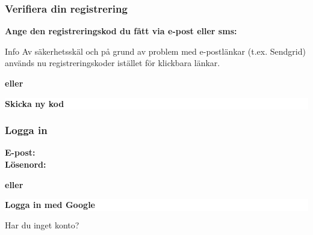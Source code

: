 \documentclass[10pt]{beamer}
\begin{document}
\begin{frame}[label=verify]
  \frametitle{Verifiera din registrering}

  \vspace{0.5cm}
  \begin{minipage}{0.9\textwidth}
    \small
    \textbf{Ange den registreringskod du fått via e-post eller sms:} \underline{\hspace{5cm}} \\

    \vspace{0.8cm}
    \begin{block}{Info}
      Av säkerhetsskäl och på grund av problem med e-postlänkar (t.ex. Sendgrid) används nu registreringskoder istället för klickbara länkar.
    \end{block}

    \vspace{1.2cm}
    \centering
    
    \vspace{1.2cm}
    \textcolor{warmbrown}{\textbf{eller}}
    
    \vspace{0.6cm}
    \colorbox{white}{%
      \parbox{5cm}{\centering\footnotesize\textbf{Skicka ny kod}}%
    }
  \end{minipage}
\end{frame}


\begin{frame}[label=login]
  \frametitle{Logga in}

  \vspace{0.5cm}
  \begin{minipage}{0.9\textwidth}
    \small
    \textbf{E-post:} \underline{\hspace{6.5cm}} \\
    \textbf{Lösenord:} \underline{\hspace{6.5cm}} \\

    \vspace{0.8cm}
    \centering

    \vspace{1.2cm}
    \textcolor{warmbrown}{\textbf{eller}}

    \vspace{0.6cm}
    \colorbox{white}{%
      \parbox{5cm}{\centering\footnotesize\textbf{Logga in med Google}}%
    }
  \end{minipage}

  \vspace{0.8cm}
  \begin{center}
    \footnotesize
    Har du inget konto? \hyperlink{register}{}
  \end{center}
\end{frame}
\end{document}

